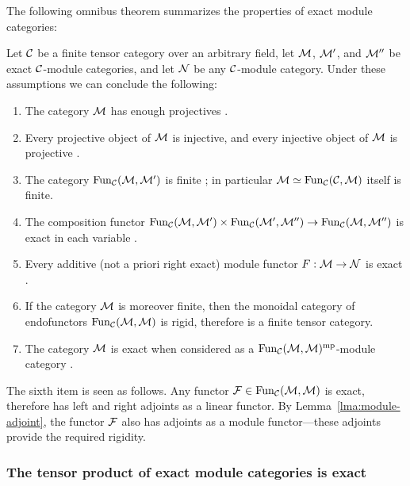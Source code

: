 \documentclass{amsart}
\begin{document}
The following omnibus theorem summarizes the properties of exact module categories: 
\begin{theorem} \label{Thm:ExactModCatOmnibus}
	Let $\mathcal C$ be a finite tensor category over an arbitrary field, let $\mathcal M$, $\mathcal M'$, and $\mathcal M''$ be exact $\mathcal C$-module categories, and let $\mathcal N$ be any $\mathcal C$-module category.  Under these assumptions we can conclude the following:
	\begin{enumerate}
		\item The category $\mathcal M$ has enough projectives \cite[Lemma 3.4]{EO-ftc} \cite[Lemma 2.7.1]{EGNO}.
		\item Every projective object of $\mathcal M$ is injective, and every injective object of $\mathcal M$ is projective \cite[Cor. 3.6]{EO-ftc} \cite[Cor 2.7.4]{EGNO}.
		\item The category $\operatorname{Fun}_{\mathcal C}(\mathcal M, \mathcal M')$ is finite \cite[Prop 2.13.5]{EGNO}; in particular $\mathcal M \simeq \operatorname{Fun}_{\mathcal C}(\mathcal C, \mathcal M)$ itself is finite. %
		\item The composition functor $\operatorname{Fun}_{\mathcal C}(\mathcal M, \mathcal M') \times \operatorname{Fun}_{\mathcal C}(\mathcal M', \mathcal M'') \to \operatorname{Fun}_{\mathcal C}(\mathcal M, \mathcal M'')$ is exact in each variable \cite[Lemma 3.20]{EO-ftc} \cite[Lemma 2.13.2]{EGNO}	.	
		\item Every additive (not a priori right exact) module functor $F:\mathcal M \to \mathcal N$ is exact \cite[Prop. 3.11]{EO-ftc} \cite[Prop 2.7.8]{EGNO}.
		\item If the category $\mathcal M$ is moreover finite, then the monoidal category of endofunctors $\operatorname{Fun}_{\mathcal C}(\mathcal M,\mathcal M)$ is rigid, therefore is a finite tensor category.
		\item The category $\mathcal M$ is exact when considered as a $\operatorname{Fun}_{\mathcal C}(\mathcal M,\mathcal M)^{\mathrm{mp}}$-module category \cite[Lemma 3.25]{EO-ftc}.
	\end{enumerate}
\end{theorem}
\nid The sixth item is seen as follows.  Any functor $\mathcal F \in \operatorname{Fun}_\mathcal C(\mathcal M,\mathcal M)$ is exact, therefore has left and right adjoints as a linear functor.  By Lemma~\ref{lma:module-adjoint}, the functor $\mathcal F$ also has adjoints as a module functor---these adjoints provide the required rigidity.  


\subsubsection{The tensor product of exact module categories is exact}
\end{document}
